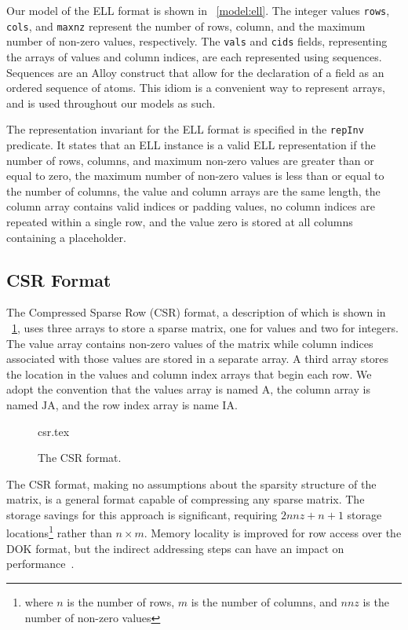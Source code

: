 Our model of the ELL format is shown in \figurename~\ref{model:ell}.  The integer values \texttt{rows}, \texttt{cols}, and \texttt{maxnz} represent the number of rows, column, and the maximum number of non-zero values, respectively.  The \texttt{vals} and \texttt{cids} fields, representing the arrays of values and column indices, are each represented using sequences.  Sequences are an Alloy construct that allow for the declaration of a field as an ordered sequence of atoms.  This idiom is a convenient way to represent arrays, and is used throughout our models as such.

The representation invariant for the ELL format is specified in the \texttt{repInv} predicate.  It states that an ELL instance is a valid ELL representation if the number of rows, columns, and maximum non-zero values are greater than or equal to zero, the maximum number of non-zero values is less than or equal to the number of columns, the value and column arrays are the same length, the column array contains valid indices or padding values, no column indices are repeated within a single row, and the value zero is stored at all columns containing a placeholder.

\subsection{CSR Format}

The Compressed Sparse Row (CSR) format, a description of which is shown in \figurename~\ref{image:csr}, uses three arrays to store a sparse matrix, one for values and two for integers.  The value array contains non-zero values of the matrix while column indices associated with those values are stored in a separate array.  A third array stores the location in the values and column index arrays that begin each row.  We adopt the convention that the values array is named $\mathrm{A}$, the column array is named $\mathrm{JA}$, and the row index array is name $\mathrm{IA}$.

\begin{figure}
\centering
{csr.tex}
\caption{The CSR format.}
\label{image:csr}
\end{figure}

The CSR format, making no assumptions about the sparsity structure of the matrix, is a general format capable of compressing any sparse matrix.  The storage savings for this approach is significant, requiring $2nnz+n+1$ storage locations\footnote{where $n$ is the number of rows, $m$ is the number of columns, and $nnz$ is the number of non-zero values} rather than $n \times m$.  Memory locality is improved for row access over the DOK format, but the indirect addressing steps can have an impact on performance~\cite{bai}.

